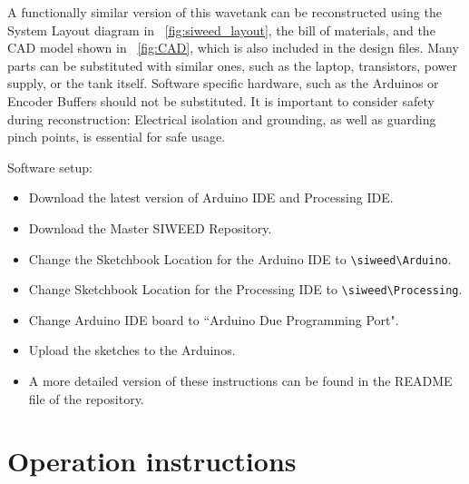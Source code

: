 \documentclass[11pt, letterpaper]{article}
\begin{document}
A functionally similar version of this wavetank can be reconstructed using the System Layout diagram in \figurename~\ref{fig:siweed_layout}, the bill of materials, and the CAD model shown in \figurename~\ref{fig:CAD}, which is also included in the design files.
Many parts can be substituted with similar ones, such as the laptop, transistors, power supply, or the tank itself.
Software specific hardware, such as the Arduinos or Encoder Buffers should not be substituted. 
It is important to consider safety during reconstruction: Electrical isolation and grounding, as well as guarding pinch points, is essential for safe usage.


Software setup:
\begin{itemize}
\item Download the latest version of Arduino IDE and Processing IDE.
\item Download the Master SIWEED Repository.
\item Change the Sketchbook Location for the Arduino IDE to \texttt{\textbackslash siweed\textbackslash Arduino}.
\item Change Sketchbook Location for the Processing IDE to \texttt{\textbackslash siweed\textbackslash Processing}.
\item Change Arduino IDE board to ``Arduino Due Programming Port".
\item Upload the sketches to the Arduinos.
\item A more detailed version of these instructions can be found in the README file of the repository.
\end{itemize}

\section{Operation instructions}
\end{document}

